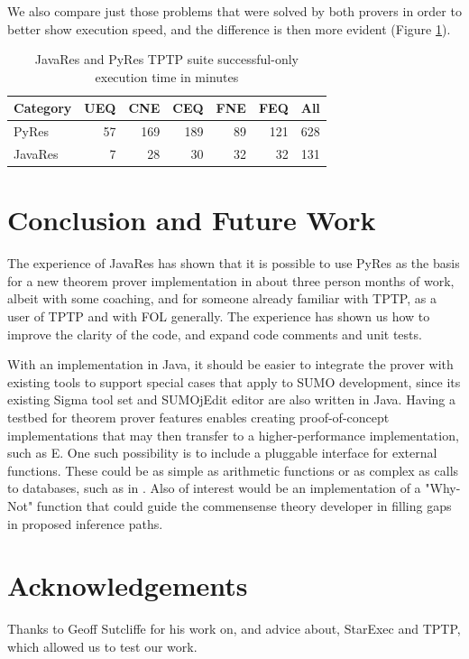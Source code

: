 \documentclass{llncs}
\begin{document}
We also compare just those problems that were solved by both provers in order to better show execution speed,
and the difference is then more evident (Figure \ref{tab:res3}).

\begin{table}[tbh]
  \begin{tabular}{lrrrrrr}
    \hline
    \textbf{Category} & \textbf{UEQ} & \textbf{CNE} & \textbf{CEQ} & \textbf{FNE} & \textbf{FEQ} & \textbf{All}\\
    \hline
    PyRes     &   57 &  169 &   189 &   89 &   121 &  628 \\
    JavaRes   &   7 &   28 &   30 &   32 &   32 &  131 \\
    \hline
  \end{tabular}
  \caption{JavaRes and PyRes TPTP suite successful-only execution time in minutes}
  \label{tab:res3}
\end{table}

\section{Conclusion and Future Work}

The experience of JavaRes has shown that it is possible to use PyRes
as the basis for a new theorem prover implementation in about three
person months of work, albeit with some coaching, and for someone
already familiar with TPTP, as a user of TPTP and with FOL generally.
The experience has shown us how to improve the clarity of the code,
and expand code comments and unit tests.

With an implementation in Java, it should be easier to integrate the
prover with existing tools to support special cases that apply to SUMO
development, since its existing Sigma tool set \cite{pease2013sigma}
and SUMOjEdit editor \cite{pease2020programmer} are also written in
Java.  Having a testbed for theorem prover features enables creating
proof-of-concept implementations that may then transfer to a
higher-performance implementation, such as E.  One such possibility is
to include a pluggable interface for external functions.  These could
be as simple as arithmetic functions or as complex as calls to
databases, such as in \cite{DBLP:conf/ki/SudaSWLM09}.  Also of
interest would be an implementation of a "Why-Not" function
\cite{10.5555/1650083.1650093} that could guide the commensense theory
developer in filling gaps in proposed inference paths.

\section{Acknowledgements}

Thanks to Geoff Sutcliffe for his work on, and advice about, StarExec
and TPTP, which allowed us to test our work.



\end{document}
